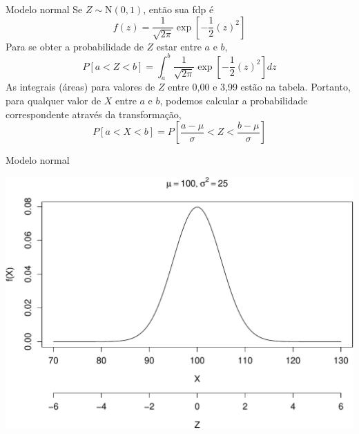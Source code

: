 \documentclass[10pt]{beamer}\usepackage[]{graphicx}\usepackage[]{color}
\newenvironment{knitrout}{}{} %
\providecommand{\N}{\text{N}}
\theoremstyle{definition}
\begin{document}
\begin{frame}[fragile]{Modelo normal}
  Se $Z \sim \N(0,1)$, então sua fdp é
  \begin{equation*}
    f(z) = \frac{1}{\sqrt{2\pi}} \exp\left[-\frac{1}{2} (z)^2 \right]
  \end{equation*}
  Para se obter a probabilidade de $Z$ estar entre $a$ e $b$,
  \begin{equation*}
    P[a < Z < b] = \int_a^b \frac{1}{\sqrt{2\pi}} \exp\left[-\frac{1}{2}
      (z)^2 \right] dz
  \end{equation*}
  As integrais (áreas) para valores de $Z$ entre 0,00 e 3,99 estão na
  tabela. Portanto, para qualquer valor de $X$ entre $a$ e $b$, podemos
  calcular a probabilidade correspondente através da transformação,
  \begin{equation*}
    P[a < X < b] = P\left[\frac{a - \mu}{\sigma} < Z < \frac{b
        - \mu}{\sigma}\right]
  \end{equation*}
\end{frame}

\begin{frame}[fragile]{Modelo normal}
\begin{knitrout}\footnotesize
{}\color{fgcolor}

{\centering \includegraphics[width=1\textwidth]{figure/unnamed-chunk-6-1} 

}



\end{knitrout}
\end{frame}
\end{document}

